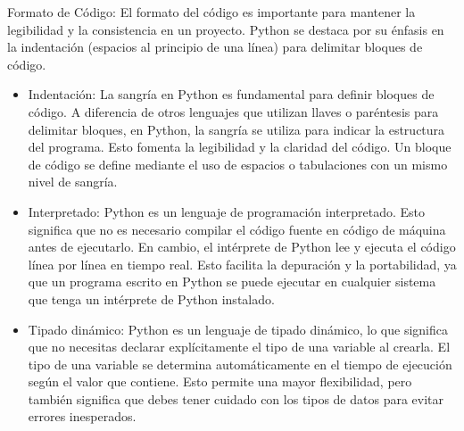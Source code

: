 Formato de Código: El formato del código es importante para mantener la legibilidad y la consistencia en un proyecto. Python se destaca por su énfasis en la indentación (espacios al principio de una línea) para delimitar bloques de código. 
\begin{itemize}
    \item Indentación: La sangría en Python es fundamental para definir bloques de código. A diferencia de otros lenguajes que utilizan llaves o paréntesis para delimitar bloques, en Python, la sangría se utiliza para indicar la estructura del programa. Esto fomenta la legibilidad y la claridad del código. Un bloque de código se define mediante el uso de espacios o tabulaciones con un mismo nivel de sangría. 
\begin{figure}[h]
    \centering
    \end{figure}
    \item Interpretado: Python es un lenguaje de programación interpretado. Esto significa que no es necesario compilar el código fuente en código de máquina antes de ejecutarlo. En cambio, el intérprete de Python lee y ejecuta el código línea por línea en tiempo real. Esto facilita la depuración y la portabilidad, ya que un programa escrito en Python se puede ejecutar en cualquier sistema que tenga un intérprete de Python instalado.
  \begin{figure}[h]
      \centering
      \end{figure}
    \item Tipado dinámico: Python es un lenguaje de tipado dinámico, lo que significa que no necesitas declarar explícitamente el tipo de una variable al crearla. El tipo de una variable se determina automáticamente en el tiempo de ejecución según el valor que contiene. Esto permite una mayor flexibilidad, pero también significa que debes tener cuidado con los tipos de datos para evitar errores inesperados. 

\end{itemize}
